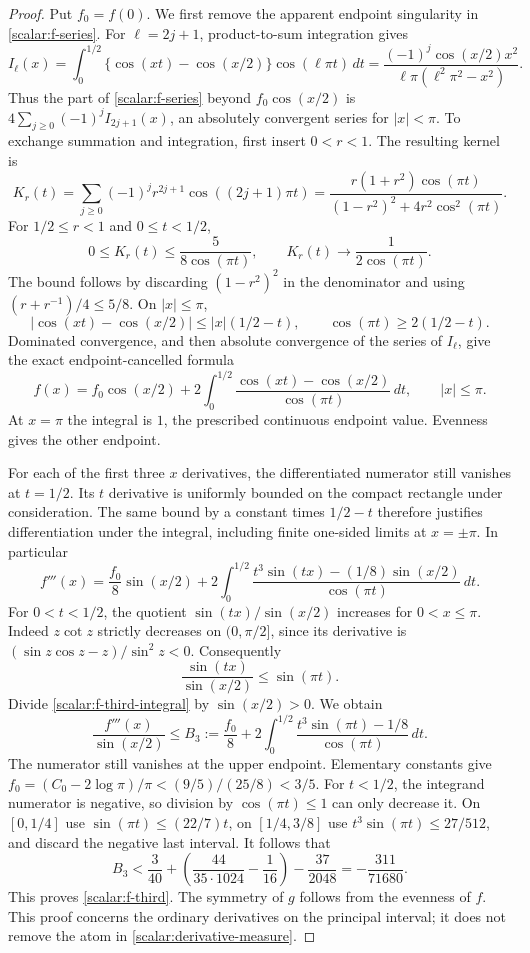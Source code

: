 \begin{proof}
Put $f_0=f(0)$.  We first remove the apparent endpoint singularity in
\eqref{scalar:f-series}.  For $\ell=2j+1$, product-to-sum integration
gives
\[
 I_\ell(x)=\int_0^{1/2}
  \{\cos(xt)-\cos(x/2)\}\cos(\ell\pi t)\,dt
 =\frac{(-1)^j\cos(x/2)x^2}
        {\ell\pi(\ell^2\pi^2-x^2)}.
\]
Thus the part of \eqref{scalar:f-series} beyond $f_0\cos(x/2)$ is
$4\sum_{j\geq0}(-1)^jI_{2j+1}(x)$, an absolutely convergent series
for $|x|<\pi$.  To exchange summation and integration, first insert
$0<r<1$.  The resulting kernel is
\[
 K_r(t)=\sum_{j\geq0}(-1)^jr^{2j+1}\cos((2j+1)\pi t)
 =\frac{r(1+r^2)\cos(\pi t)}
 {(1-r^2)^2+4r^2\cos^2(\pi t)}.
\]
For $1/2\leq r<1$ and $0\leq t<1/2$,
\[
 0\leq K_r(t)\leq\frac5{8\cos(\pi t)},\qquad
 K_r(t)\longrightarrow\frac1{2\cos(\pi t)}.
\]
The bound follows by discarding $(1-r^2)^2$ in the denominator and
using $(r+r^{-1})/4\leq5/8$.  On $|x|\leq\pi$,
\[
 |\cos(xt)-\cos(x/2)|\leq |x|(1/2-t),\qquad
 \cos(\pi t)\geq2(1/2-t).
\]
Dominated convergence, and then absolute convergence of the series of
$I_\ell$, give the exact endpoint-cancelled formula
\begin{equation}\label{scalar:f-integral}
 f(x)=f_0\cos(x/2)+2\int_0^{1/2}
          \frac{\cos(xt)-\cos(x/2)}{\cos(\pi t)}\,dt,
 \qquad |x|\leq\pi.
\end{equation}
At $x=\pi$ the integral is $1$, the prescribed continuous endpoint
value.  Evenness gives the other endpoint.

For each of the first three $x$ derivatives, the differentiated
numerator still vanishes at $t=1/2$.  Its $t$ derivative is uniformly
bounded on the compact rectangle under consideration.  The same bound
by a constant times $1/2-t$ therefore justifies differentiation under
the integral, including finite one-sided limits at $x=\pm\pi$.
In particular
\begin{equation}\label{scalar:f-third-integral}
 f'''(x)=\frac{f_0}{8}\sin(x/2)
 +2\int_0^{1/2}
  \frac{t^3\sin(tx)-(1/8)\sin(x/2)}{\cos(\pi t)}\,dt.
\end{equation}
For $0<t<1/2$, the quotient
$\sin(tx)/\sin(x/2)$ increases for $0<x\leq\pi$.
Indeed $z\cot z$ strictly decreases on $(0,\pi/2]$, since
its derivative is $(\sin z\cos z-z)/\sin^2z<0$.
Consequently
\[
 \frac{\sin(tx)}{\sin(x/2)}\leq\sin(\pi t).
\]
Divide \eqref{scalar:f-third-integral} by $\sin(x/2)>0$.  We obtain
\[
 \frac{f'''(x)}{\sin(x/2)}\leq
 B_3:=\frac{f_0}{8}
 +2\int_0^{1/2}\frac{t^3\sin(\pi t)-1/8}{\cos(\pi t)}\,dt.
\]
The numerator still vanishes at the upper endpoint.  Elementary
constants give
$f_0=(C_0-2\log\pi)/\pi<(9/5)/(25/8)<3/5$.
For $t<1/2$, the integrand numerator is negative, so division by
$\cos(\pi t)\leq1$ can only decrease it.  On $[0,1/4]$ use
$\sin(\pi t)\leq(22/7)t$, on $[1/4,3/8]$ use
$t^3\sin(\pi t)\leq27/512$, and discard the negative last interval.
It follows that
\[
 B_3<\frac3{40}
   +\left(\frac{44}{35\cdot1024}-\frac1{16}\right)
   -\frac{37}{2048}
   =-\frac{311}{71680}.
\]
This proves \eqref{scalar:f-third}.  The symmetry of $g$ follows from
the evenness of $f$.  This proof concerns the ordinary derivatives on
the principal interval; it does not remove the atom in
\eqref{scalar:derivative-measure}.
\end{proof}

